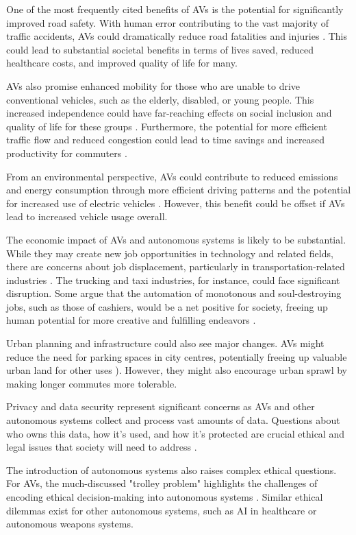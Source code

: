 One of the most frequently cited benefits of AVs is the potential for significantly improved road safety. With human error contributing to the vast majority of traffic accidents, AVs could dramatically reduce road fatalities and injuries \cite{Fagnant2015}. This could lead to substantial societal benefits in terms of lives saved, reduced healthcare costs, and improved quality of life for many.

AVs also promise enhanced mobility for those who are unable to drive conventional vehicles, such as the elderly, disabled, or young people. This increased independence could have far-reaching effects on social inclusion and quality of life for these groups \cite{Harper2016}. Furthermore, the potential for more efficient traffic flow and reduced congestion could lead to time savings and increased productivity for commuters \cite{Wadud2016}.

From an environmental perspective, AVs could contribute to reduced emissions and energy consumption through more efficient driving patterns and the potential for increased use of electric vehicles \cite{Greenblatt2015}. However, this benefit could be offset if AVs lead to increased vehicle usage overall.

The economic impact of AVs and autonomous systems is likely to be substantial. While they may create new job opportunities in technology and related fields, there are concerns about job displacement, particularly in transportation-related industries \cite{Autor2015}. The trucking and taxi industries, for instance, could face significant disruption. Some argue that the automation of monotonous and soul-destroying jobs, such as those of cashiers, would be a net positive for society, freeing up human potential for more creative and fulfilling endeavors \cite{Picone2025}.

Urban planning and infrastructure could also see major changes. AVs might reduce the need for parking spaces in city centres, potentially freeing up valuable urban land for other uses \cite{Duarte2018}). However, they might also encourage urban sprawl by making longer commutes more tolerable.

Privacy and data security represent significant concerns as AVs and other autonomous systems collect and process vast amounts of data. Questions about who owns this data, how it's used, and how it's protected are crucial ethical and legal issues that society will need to address \cite{Taeihagh2019}.

The introduction of autonomous systems also raises complex ethical questions. For AVs, the much-discussed "trolley problem" highlights the challenges of encoding ethical decision-making into autonomous systems \cite{Awad2018}. Similar ethical dilemmas exist for other autonomous systems, such as AI in healthcare or autonomous weapons systems.

